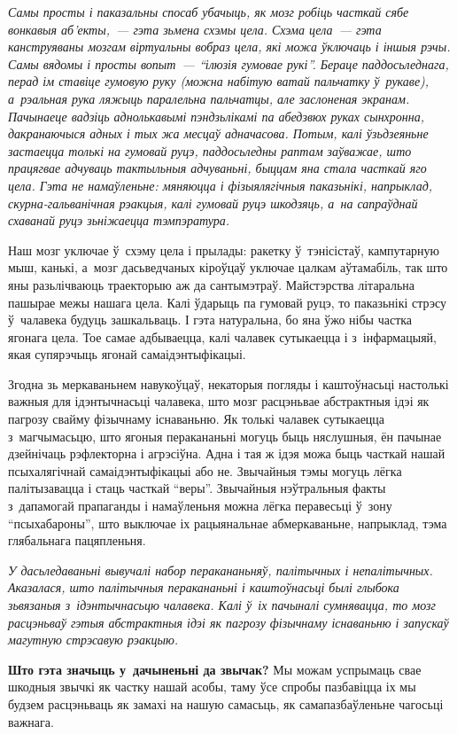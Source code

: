 \emph{Самы просты і паказальны спосаб убачыць, як мозг робіць часткай сябе вонкавыя аб'екты,~--- гэта зьмена схэмы цела. Схэма цела~--- гэта канструяваны мозгам віртуальны вобраз цела, які можа ўключаць і іншыя рэчы. Самы вядомы і просты вопыт~--- ``ілюзія гумовае рукі''. Бераце паддосьледнага, перад ім ставіце гумовую руку (можна набітую ватай пальчатку ў~рукаве), а~рэальная рука ляжыць паралельна пальчатцы, але заслоненая экранам. Пачынаеце вадзіць аднолькавымі пэндзьлікамі па абедзвюх руках сынхронна, дакранаючыся адных і тых жа месцаў адначасова. Потым, калі ўзьдзеяньне застаецца толькі на гумовай руцэ, паддосьледны раптам заўважае, што працягвае адчуваць тактыльныя адчуваньні, быццам яна стала часткай яго цела. Гэта не намаўленьне: мяняюцца і фізыялягічныя паказьнікі, напрыклад, скурна-гальванічная рэакцыя, калі гумовай руцэ шкодзяць, а~на сапраўднай схаванай руцэ зьніжаецца тэмпэратура.}

Наш мозг уключае ў~схэму цела і прылады: ракетку ў~тэнісістаў, кампутарную мыш, канькі, а~мозг дасьведчаных кіроўцаў уключае цалкам аўтамабіль, так што яны разьлічваюць траекторыю аж да сантымэтраў. Майстэрства літаральна пашырае межы нашага цела. Калі ўдарыць па гумовай руцэ, то паказьнікі стрэсу ў~чалавека будуць зашкальваць. І гэта натуральна, бо яна ўжо нібы частка ягонага цела. Тое самае адбываецца, калі чалавек сутыкаецца і з~інфармацыяй, якая супярэчыць ягонай самаідэнтыфікацыі.

Згодна зь меркаваньнем навукоўцаў, некаторыя погляды і каштоўнасьці настолькі важныя для ідэнтычнасьці чалавека, што мозг расцэньвае абстрактныя ідэі як пагрозу свайму фізычнаму існаваньню. Як толькі чалавек сутыкаецца з~магчымасьцю, што ягоныя перакананьні могуць быць няслушныя, ён пачынае дзейнічаць рэфлекторна і агрэсіўна. Адна і тая ж ідэя можа быць часткай нашай псыхалягічнай самаідэнтыфікацыі або не. Звычайныя тэмы могуць лёгка палітызавацца і стаць часткай ``веры''. Звычайныя нэўтральныя факты з~дапамогай прапаганды і намаўленьня можна лёгка перавесьці ў~зону ``псыхабароны'', што выключае іх рацыянальнае абмеркаваньне, напрыклад, тэма глябальнага пацяпленьня.

\emph{У дасьледаваньні вывучалі набор перакананьняў, палітычных і непалітычных. Аказалася, што палітычныя перакананьні і каштоўнасьці былі глыбока зьвязаныя з~ідэнтычнасьцю чалавека. Калі ў~іх пачыналі сумнявацца, то мозг расцэньваў гэтыя абстрактныя ідэі як пагрозу фізычнаму існаваньню і запускаў магутную стрэсавую рэакцыю.}

\textbf{Што гэта значыць у~дачыненьні да звычак?} Мы можам успрымаць свае шкодныя звычкі як частку нашай асобы, таму ўсе спробы пазбавіцца іх мы будзем расцэньваць як замахі на нашую самасьць, як самапазбаўленьне чагосьці важнага. 

